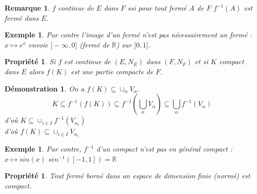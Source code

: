 \documentclass[a4paper, oneside]{report}
\theoremstyle{break}
\newtheorem{propr}[thm]{Propriété}
\newtheorem{exem}[thm]{Exemple}
\newtheorem*{demo}{Démonstration}
\newtheorem{remar}[thm]{Remarque}
\newcommand{\R}{\mathbb{R}}
\begin{document}
\begin{remar}
$f$ continue de $E$ dans $F$ ssi pour tout fermé $A$ de $F$ $f^{-1}(A)$ est fermé dans $E$.
\end{remar}


\begin{exem}
Par contre l'image d'un fermé n'est pas nécessairement un fermé : $x\mapsto e^x$ envoie $]-\infty,0]$ (fermé de $\R$) sur $]0,1]$.

\end{exem}

\begin{propr}
Si $f$ est continue de $(E, N_E)$ dans $(F, N_F)$ et si $K$ compact dans $E$ alors $f(K)$ est une partie compacte de $F$.
\end{propr}

\begin{demo}
On a $f(K)\subseteq \cup_\alpha V_\alpha$.
$$K\subseteq f^{-1}(f(K)) \subseteq f^{-1}(\bigcup_\alpha V_\alpha)\subseteq \bigcup_\alpha f^{-1}(V_\alpha)$$
d'où $K\subseteq \cup_{i\in I} f^{-1}(V_{\alpha_i})$\\
d'où $f(K)\subseteq \cup_{i\in I} V_{\alpha_i}$
\end{demo}


\begin{exem}
Par contre, $f^{-1}$ d'un compact n'est pas en général compact : $x\mapsto sin(x)$ $sin^{-1}([-1,1])=\R$

\end{exem}

\begin{propr}
Tout fermé borné dans un espace de dimension finie (normé) est compact.
\end{propr}
\end{document}
